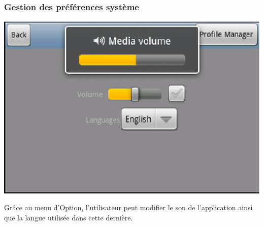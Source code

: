 	\subsubsection{Gestion des préférences système}
		\begin{center}						
			\includegraphics[scale=0.6]{Developpement/Img/4.eps}
		\end{center}
	Grâce au menu d'Option, l'utilisateur peut
	modifier le son de l'application ainsi que la langue utilisée dans cette
	dernière.
	
